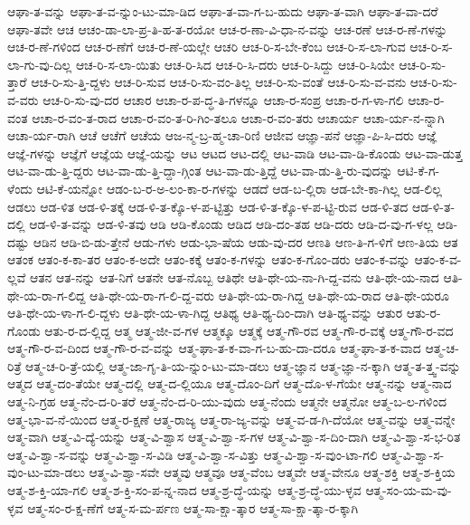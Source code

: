 {ಆಘಾ-ತ-ವನ್ನು
ಆಘಾ-ತ-ವ-ನ್ನುಂ-ಟು-ಮಾ-ಡಿದ
ಆಘಾ-ತ-ವಾ-ಗ-ಬ-ಹುದು
ಆಘಾ-ತ-ವಾಗಿ
ಆಘಾ-ತ-ವಾ-ದರೆ
ಆಘಾ-ತವೇ
ಆಚ
ಆಚಂ-ಡಾ-ಲಾ-ಪ್ರ-ತಿ-ಹ-ತ-ರಯೋ
ಆಚ-ರ-ಣಾ-ವಿ-ಧಾ-ನ-ವನ್ನು
ಆಚ-ರಣೆ
ಆಚ-ರ-ಣೆ-ಗಳನ್ನು
ಆಚ-ರ-ಣೆ-ಗಳಿಂದ
ಆಚ-ರ-ಣೆಗೆ
ಆಚ-ರ-ಣೆ-ಯಲ್ಲೇ
ಆಚರಿ
ಆಚ-ರಿ-ಸ-ಬೇ-ಕೆಂಬ
ಆಚ-ರಿ-ಸ-ಲಾ-ಗುವ
ಆಚ-ರಿ-ಸ-ಲಾ-ಗು-ವು-ದಿಲ್ಲ
ಆಚ-ರಿ-ಸ-ಲಾ-ಯಿತು
ಆಚ-ರಿ-ಸಿದ
ಆಚ-ರಿ-ಸಿ-ದರು
ಆಚ-ರಿ-ಸಿದ್ದು
ಆಚ-ರಿ-ಸಿಯೇ
ಆಚ-ರಿ-ಸು-ತ್ತಾರೆ
ಆಚ-ರಿ-ಸು-ತ್ತಿ-ದ್ದಳು
ಆಚ-ರಿ-ಸುವ
ಆಚ-ರಿ-ಸು-ವಂ-ತಿಲ್ಲ
ಆಚ-ರಿ-ಸು-ವಂತೆ
ಆಚ-ರಿ-ಸು-ವ-ವನು
ಆಚ-ರಿ-ಸು-ವ-ವರು
ಆಚ-ರಿ-ಸು-ವು-ದರ
ಆಚಾರ
ಆಚಾ-ರ-ಪ-ದ್ಧ-ತಿ-ಗಳನ್ನೂ
ಆಚಾ-ರ-ಸಂಪ್ರ
ಆಚಾ-ರ-ಗ-ಳಾ-ಗಲಿ
ಆಚಾ-ರ-ವಂತ
ಆಚಾ-ರ-ವಂ-ತ-ರಾದ
ಆಚಾ-ರ-ವಂ-ತ-ರಿ-ಗಿಂ-ತಲೂ
ಆಚಾ-ರ-ವಂ-ತರು
ಆಚಾರ್ಯ
ಆಚಾ-ರ್ಯ-ನ-ನ್ನಾಗಿ
ಆಚಾ-ರ್ಯ-ರಾಗಿ
ಆಚೆ
ಆಚೆಗೆ
ಆಚೆಯ
ಆಜ-ನ್ಮ-ಬ್ರ-ಹ್ಮ-ಚಾ-ರಿಣಿ
ಆಜೀವ
ಆಜ್ಞಾ-ಪನೆ
ಆಜ್ಞಾ-ಪಿ-ಸಿ-ದರು
ಆಜ್ಞೆ
ಆಜ್ಞೆ-ಗಳನ್ನು
ಆಜ್ಞೆಗೆ
ಆಜ್ಞೆಯ
ಆಜ್ಞೆ-ಯನ್ನು
ಆಟ
ಆಟದ
ಆಟ-ದಲ್ಲಿ
ಆಟ-ವಾಡಿ
ಆಟ-ವಾ-ಡಿ-ಕೊಂಡು
ಆಟ-ವಾ-ಡುತ್ತ
ಆಟ-ವಾ-ಡು-ತ್ತಿ-ದ್ದರು
ಆಟ-ವಾ-ಡು-ತ್ತಿ-ದ್ದಾ-ಗ್ಗಿಂತ
ಆಟ-ವಾ-ಡು-ತ್ತಿದ್ದೆ
ಆಟ-ವಾ-ಡು-ತ್ತಿ-ರು-ವುದನ್ನು
ಆಟಿ-ಕೆ-ಗ-ಳೆಂದು
ಆಟಿ-ಕೆ-ಯನ್ನೋ
ಆಡಂ-ಬ-ರ-ಅ-ಲಂ-ಕಾ-ರ-ಗಳನ್ನು
ಆಡದೆ
ಆಡ-ಬ-ಲ್ಲಿರಾ
ಆಡ-ಬೇ-ಕಾ-ಗಿಲ್ಲ
ಆಡ-ಲಿಲ್ಲ
ಆಡಲು
ಆಡ-ಳಿತ
ಆಡ-ಳಿ-ತಕ್ಕೆ
ಆಡ-ಳಿ-ತ-ಕ್ಕೊ-ಳ-ಪ-ಟ್ಟಿತ್ತು
ಆಡ-ಳಿ-ತ-ಕ್ಕೊ-ಳ-ಪ-ಟ್ಟಿ-ರುವ
ಆಡ-ಳಿ-ತದ
ಆಡ-ಳಿ-ತ-ದಲ್ಲಿ
ಆಡ-ಳಿ-ತ-ವನ್ನು
ಆಡ-ಳಿ-ತವು
ಆಡಿ
ಆಡಿ-ಕೊಂಡು
ಆಡಿದ
ಆಡಿ-ದಂ-ತಹ
ಆಡಿ-ದರು
ಆಡಿ-ದ-ವು-ಗ-ಳಲ್ಲ
ಆಡಿ-ದಷ್ಟು
ಆಡಿನ
ಆಡಿ-ಬಿ-ಡು-ತ್ತೇನೆ
ಆಡು-ಗಳು
ಆಡು-ಭಾ-ಷೆಯ
ಆಡು-ವು-ದರ
ಆಣತಿ
ಆಣ-ತಿ-ಗ-ಳಿಗೆ
ಆಣ-ತಿಯ
ಆತ
ಆತಂಕ
ಆತಂ-ಕ-ಕಾ-ತರ
ಆತಂ-ಕ-ಅದೇ
ಆತಂ-ಕಕ್ಕೆ
ಆತಂ-ಕ-ಗಳನ್ನು
ಆತಂ-ಕ-ಗೊಂ-ಡರು
ಆತಂ-ಕ-ವನ್ನು
ಆತಂ-ಕ-ವ-ಲ್ಲವೆ
ಆತನ
ಆತ-ನನ್ನು
ಆತ-ನಿಗೆ
ಆತನೇ
ಆತ-ನೊಬ್ಬ
ಆತಿಥೇ
ಆತಿ-ಥೇ-ಯ-ನಾ-ಗಿ-ದ್ದ-ವನು
ಆತಿ-ಥೇ-ಯ-ನಾದ
ಆತಿ-ಥೇ-ಯ-ರಾ-ಗ-ಲಿದ್ದ
ಆತಿ-ಥೇ-ಯ-ರಾ-ಗ-ಲಿ-ದ್ದ-ವರು
ಆತಿ-ಥೇ-ಯ-ರಾ-ಗಿದ್ದ
ಆತಿ-ಥೇ-ಯ-ರಾದ
ಆತಿ-ಥೇ-ಯರೂ
ಆತಿ-ಥೇ-ಯ-ಳಾ-ಗ-ಲಿ-ದ್ದಳು
ಆತಿ-ಥೇ-ಯ-ಳಾ-ಗಿದ್ದ
ಆತಿಥ್ಯ
ಆತಿ-ಥ್ಯ-ದಿಂ-ದಾಗಿ
ಆತಿ-ಥ್ಯ-ವನ್ನು
ಆತುರ
ಆತು-ರ-ಗೊಂಡು
ಆತು-ರ-ದ-ಲ್ಲಿದ್ದ
ಆತ್ಮ
ಆತ್ಮ-ಜೀ-ವ-ಗಳ
ಆತ್ಮಕ್ಕೂ
ಆತ್ಮಕ್ಕೆ
ಆತ್ಮ-ಗೌ-ರವ
ಆತ್ಮ-ಗೌ-ರ-ವಕ್ಕೆ
ಆತ್ಮ-ಗೌ-ರ-ವದ
ಆತ್ಮ-ಗೌ-ರ-ವ-ದಿಂದ
ಆತ್ಮ-ಗೌ-ರ-ವ-ವನ್ನು
ಆತ್ಮ-ಘಾ-ತ-ಕ-ವಾ-ಗ-ಬ-ಹು-ದಾ-ದರೂ
ಆತ್ಮ-ಘಾ-ತ-ಕ-ವಾದ
ಆತ್ಮ-ಚ-ರಿತ್ರೆ
ಆತ್ಮ-ಚ-ರಿ-ತ್ರೆ-ಯಲ್ಲಿ
ಆತ್ಮ-ಜಾ-ಗೃ-ತಿ-ಯ-ನ್ನುಂ-ಟು-ಮಾ-ಡಲು
ಆತ್ಮ-ಜ್ಞಾನ
ಆತ್ಮ-ಜ್ಞಾ-ನ-ಕ್ಕಾಗಿ
ಆತ್ಮ-ತ-ತ್ತ್ವ-ವನ್ನು
ಆತ್ಮದ
ಆತ್ಮ-ದಂ-ತೆಯೇ
ಆತ್ಮ-ದಲ್ಲಿ
ಆತ್ಮ-ದ-ಲ್ಲಿಯೂ
ಆತ್ಮ-ದೊಂ-ದಿಗೆ
ಆತ್ಮ-ದೊ-ಳ-ಗೆಯೇ
ಆತ್ಮ-ನನ್ನು
ಆತ್ಮ-ನಾದ
ಆತ್ಮ-ನಿ-ಗ್ರಹ
ಆತ್ಮ-ನೆಂ-ದ-ರಿ-ತರೆ
ಆತ್ಮ-ನೆಂ-ದ-ರಿ-ಯು-ವುದು
ಆತ್ಮ-ನೆಂದು
ಆತ್ಮನೇ
ಆತ್ಮನೋ
ಆತ್ಮ-ಬ-ಲ-ಗಳಿಂದ
ಆತ್ಮ-ಭಾ-ವ-ನೆ-ಯಿಂದ
ಆತ್ಮ-ರ-ಕ್ಷಣೆ
ಆತ್ಮ-ರಾಜ್ಯ
ಆತ್ಮ-ರಾ-ಜ್ಯ-ವನ್ನು
ಆತ್ಮ-ವ-ಡ-ಗಿ-ದೆಯೋ
ಆತ್ಮ-ವನ್ನು
ಆತ್ಮ-ವನ್ನೇ
ಆತ್ಮ-ವಾಗಿ
ಆತ್ಮ-ವಿ-ದ್ಯೆ-ಯನ್ನು
ಆತ್ಮ-ವಿ-ಶ್ವಾಸ
ಆತ್ಮ-ವಿ-ಶ್ವಾ-ಸ-ಗಳ
ಆತ್ಮ-ವಿ-ಶ್ವಾ-ಸ-ದಿಂ-ದಾಗಿ
ಆತ್ಮ-ವಿ-ಶ್ವಾ-ಸ-ಭ-ರಿತ
ಆತ್ಮ-ವಿ-ಶ್ವಾ-ಸ-ವನ್ನು
ಆತ್ಮ-ವಿ-ಶ್ವಾ-ಸ-ವಿಡಿ
ಆತ್ಮ-ವಿ-ಶ್ವಾ-ಸ-ವಿತ್ತು
ಆತ್ಮ-ವಿ-ಶ್ವಾ-ಸ-ವುಂ-ಟಾ-ಗಲಿ
ಆತ್ಮ-ವಿ-ಶ್ವಾ-ಸ-ವುಂ-ಟು-ಮಾ-ಡಲು
ಆತ್ಮ-ವಿ-ಶ್ವಾ-ಸವೇ
ಆತ್ಮವು
ಆತ್ಮವೂ
ಆತ್ಮ-ವೆಂಬ
ಆತ್ಮವೇ
ಆತ್ಮ-ವೇನೂ
ಆತ್ಮ-ಶಕ್ತಿ
ಆತ್ಮ-ಶ-ಕ್ತಿಯ
ಆತ್ಮ-ಶ-ಕ್ತಿ-ಯಾ-ಗಲಿ
ಆತ್ಮ-ಶ-ಕ್ತಿ-ಸಂ-ಪ-ನ್ನ-ನಾದ
ಆತ್ಮ-ಶ್ರ-ದ್ಧೆ-ಯನ್ನು
ಆತ್ಮ-ಶ್ರ-ದ್ಧೆ-ಯು-ಳ್ಳವ
ಆತ್ಮ-ಸಂ-ಯ-ಮ-ವು-ಳ್ಳವ
ಆತ್ಮ-ಸಂ-ರ-ಕ್ಷ-ಣೆಗೆ
ಆತ್ಮ-ಸ-ಮ-ರ್ಪಣ
ಆತ್ಮ-ಸಾ-ಕ್ಷಾ-ತ್ಕಾರ
ಆತ್ಮ-ಸಾ-ಕ್ಷಾ-ತ್ಕಾ-ರ-ಕ್ಕಾಗಿ
}
